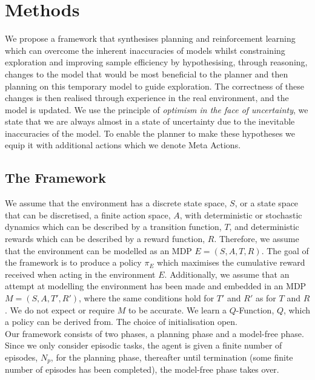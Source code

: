 \chapter{Methods}
\label{chapter4}
We propose a framework that synthesises planning and reinforcement learning which can overcome the inherent inaccuracies of models whilst constraining exploration  and improving sample efficiency by hypothesising, through reasoning, changes to the model that would be most beneficial to the planner and then planning on this temporary model to guide exploration. The correctness of these changes is then realised through experience in the real environment, and the model is updated.
We use the principle of \textit{optimism in the face of uncertainty}, we state that we are always almost in a state of uncertainty due to the inevitable inaccuracies of the model.
To enable the planner to make these hypotheses we equip it with additional actions which we denote Meta Actions.

\section{The Framework}
We assume that the environment has a discrete state space, $S$, or a state space that can be discretised, a finite action space, $A$, with deterministic or stochastic dynamics which can be described by a transition function, $T$, and deterministic rewards which can be described by a reward function, $R$. Therefore, we assume that the environment can be modelled as an MDP $E = (S, A, T, R)$. The goal of the framework is to produce a policy $\pi_E$ which maximises the cumulative reward received when acting in the environment $E$.
Additionally, we assume that an attempt at modelling the environment has been made and embedded in an MDP $M = (S, A, T', R')$, where the same conditions hold for $T'$ and $R'$ as for $T$ and $R$. We do not expect or require $M$ to be accurate. We learn a $Q$-Function, $Q$, which a policy can be derived from. The choice of initialisation open.
\\Our framework consists of two phases, a planning phase and a model-free phase. Since we only consider episodic tasks, the agent is given a finite number of episodes, $N_p$, for the planning phase, thereafter until termination (some finite number of episodes has been completed), the model-free phase takes over.

